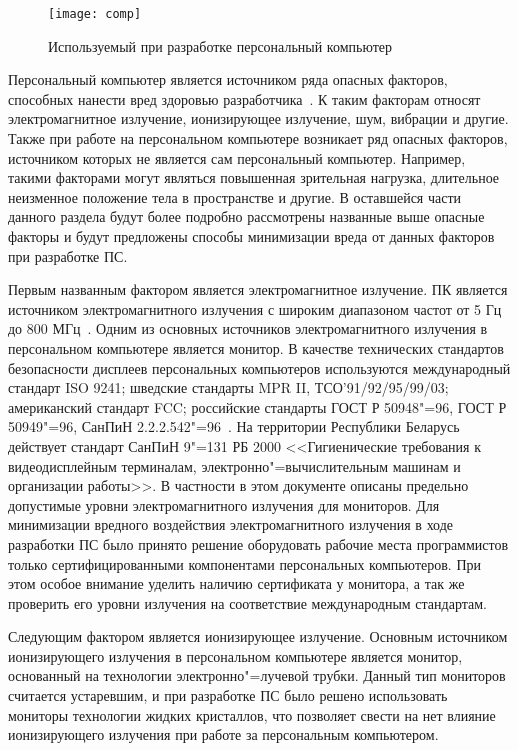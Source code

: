 \begin{figure}[ht!]
  \begin{center}
    \texttt{[image: comp]}
    \caption{Используемый при разработке персональный компьютер}
    \label{ot_pc_pic}
  \end{center}
\end{figure}

Персональный компьютер является источником ряда опасных факторов, способных нанести вред здоровью разработчика~\cite{yashin_2009}.
К таким факторам относят электромагнитное излучение, ионизирующее излучение, шум, вибрации и другие.
Также при работе на персональном компьютере возникает ряд опасных факторов, источником которых не является сам персональный компьютер.
Например, такими факторами могут являться повышенная зрительная нагрузка, длительное неизменное положение тела в пространстве и другие.
В оставшейся части данного раздела будут более подробно рассмотрены названные выше опасные факторы
и будут предложены способы минимизации вреда от данных факторов при разработке ПС.

Первым названным фактором является электромагнитное излучение.
ПК является источником электромагнитного излучения с широким диапазоном частот от 5 Гц до 800 МГц~\cite{ot_emr_pc}.
Одним из основных источников электромагнитного излучения в персональном компьютере является монитор.
В качестве технических стандартов безопасности дисплеев персональных компьютеров используются
  международный стандарт ISO 9241;
  шведские стандарты MPR II, ТСО'91/92/95/99/03;
  американский стандарт FCC;
  российские стандарты ГОСТ Р 50948"=96, ГОСТ Р 50949"=96, СанПиН 2.2.2.542"=96~\cite{ot_emr_pc}.
На территории Республики Беларусь действует стандарт СанПиН 9"=131 РБ 2000 <<Гигиенические требования к видеодисплейным терминалам, электронно"=вычислительным машинам и организации работы>>.
В частности в этом документе описаны предельно допустимые уровни электромагнитного излучения для мониторов.
Для минимизации вредного воздействия электромагнитного излучения в ходе разработки ПС было принято решение оборудовать рабочие места программистов только сертифицированными компонентами персональных компьютеров. При этом особое внимание уделить наличию сертификата у монитора, а так же проверить его уровни излучения на соответствие международным стандартам.

Следующим фактором является ионизирующее излучение.
Основным источником ионизирующего излучения в персональном компьютере является монитор, основанный на технологии электронно"=лучевой трубки.
Данный тип мониторов считается устаревшим, и при разработке ПС было решено использовать мониторы технологии жидких кристаллов,
что позволяет свести на нет влияние ионизирующего излучения при работе за персональным компьютером.

